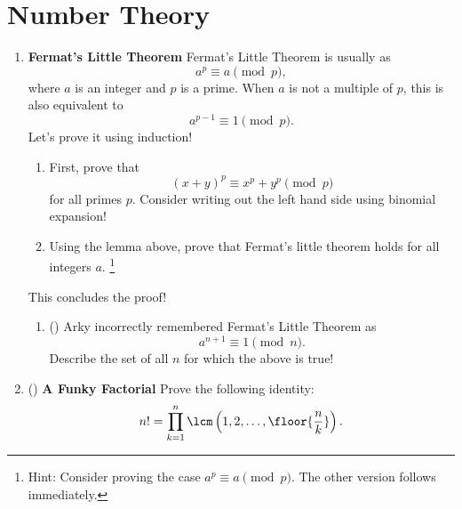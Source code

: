 \documentclass[11pt]{scrartcl}
\begin{document}
\section{Number Theory}
\begin{enumerate}[label=\textbf{N\arabic*}.]
    \item \textbf{Fermat's Little Theorem} \newline
    Fermat's Little Theorem is usually as
    \[ a^p \equiv a \pmod{p}, \]
    where $a$ is an integer and $p$ is a prime. When $a$ is not a multiple of $p$, this is also equivalent to
    \[ a^{p-1} \equiv 1 \pmod{p}. \]
    Let's prove it using induction!
    \begin{enumerate}
        \item First, prove that
        \[ (x + y)^p \equiv x^p + y^p \pmod{p} \]
        for all primes $p$. Consider writing out the left hand side using binomial expansion!
        
        \item Using the lemma above, prove that Fermat's little theorem holds for all integers $a$. \footnote{Hint: Consider proving the case $a^p \equiv a \pmod{p}$. The other version follows immediately.}
    \end{enumerate}
    
    This concludes the proof!
    
    \begin{enumerate}[start = 3]
        \item (\fullchili) Arky incorrectly remembered Fermat's Little Theorem as
        \[ a^{n+1} \equiv 1 \pmod{n}. \]
        Describe the set of all $n$ for which the above is true!
    \end{enumerate}
    
    \item (\fullchili) \textbf{A Funky Factorial} \newline
    Prove the following identity:
    \[ n! = \prod_{k = 1}^n \lcm \left(1, 2, \dots, \floor{\frac{n}{k}}\right). \]
\end{enumerate}
\end{document}
